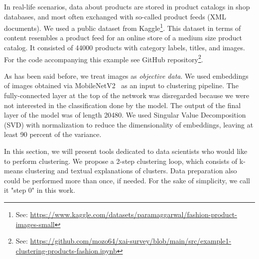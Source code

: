 \documentclass[
 twocolumn,
 hf,
]{ceurart}
\begin{document}
In real-life scenarios, data about products are stored in product catalogs in shop databases, and most often exchanged with so-called product feeds (XML documents).
We used a public dataset from Kaggle\footnote{See: \url{https://www.kaggle.com/datasets/paramaggarwal/fashion-product-images-small}}.
This dataset in terms of content resembles a product feed for an online store of a medium size product catalog.
It consisted of 44000 products with category labels, titles, and images.
For the code accompanying this example see GitHub repository\footnote{See: \url{https://github.com/mozo64/xai-survey/blob/main/src/example1-clustering-products-fashion.ipynb}}.

As has been said before, we treat images as \textit{objective data}.
We used embeddings of images obtained via MobileNetV2~\cite{sandler2019mobilenetv2} as an input to clustering pipeline.
The fully-connected layer at the top of the network was disregarded because we were not interested in the classification done by the model.
The output of the final layer of the model was of length 20480.
We used Singular Value Decomposition (SVD) with normalization to reduce the dimensionality of embeddings, leaving at least 90 percent of the variance.

In this section, we will present tools dedicated to data scientists who would like to perform clustering.
We propose a 2-step clustering loop, which consists of k-means clustering and textual explanations of clusters.
Data preparation also could be performed more than once, if needed.
For the sake of simplicity, we call it "step 0" in this work.
\end{document}
